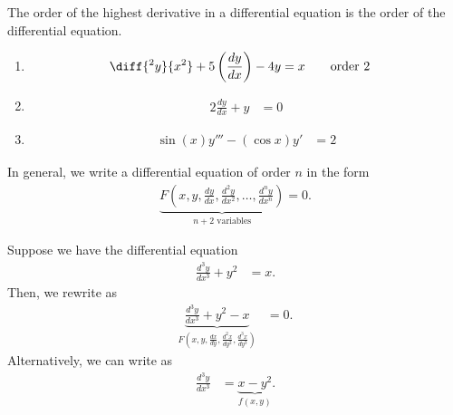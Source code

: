 \documentclass[10pt]{mypackage}
\begin{document}
  \begin{definition}
    The order of the highest derivative in a differential equation is the order of the differential equation.
  \end{definition}
  \begin{example}\hfill
    \begin{enumerate}[(1)]
      \item 
        \begin{align*}
          \diff{^2y}{x^2} + 5\left(\frac{dy}{dx}\right) - 4y &= x \tag*{order 2}
        \end{align*}
      \item 
        \begin{align*}
          2\frac{dy}{dx} + y &= 0\tag*{order 1}
        \end{align*}
      \item 
        \begin{align*}
          \sin(x)y''' - \left(\cos x\right)y' &= 2\tag*{order 3}
        \end{align*}
    \end{enumerate}
  \end{example}
  In general, we write a differential equation of order $n$ in the form
  \begin{align*}
    \underbrace{F\left(x,y,\frac{dy}{dx},\frac{d^2y}{dx^2},\dots,\frac{d^ny}{dx^n}\right)}_{\text{$n+2$ variables}} = 0.
  \end{align*}
  \begin{example}
    Suppose we have the differential equation
    \begin{align*}
      \frac{d^3y}{dx^3} + y^2 &= x.
    \end{align*}
    Then, we rewrite as
    \begin{align*}
      \underbrace{\frac{d^3y}{dx^3} + y^2 - x}_{F\left(x,y,\frac{dx}{dy},\frac{d^2x}{dy^2},\frac{d^3x}{dy^3}\right)} &= 0.
    \end{align*}
    Alternatively, we can write as
    \begin{align*}
      \frac{d^3y}{dx^3} &= \underbrace{x - y^2}_{f(x,y)}.
    \end{align*}
  \end{example}
\end{document}

